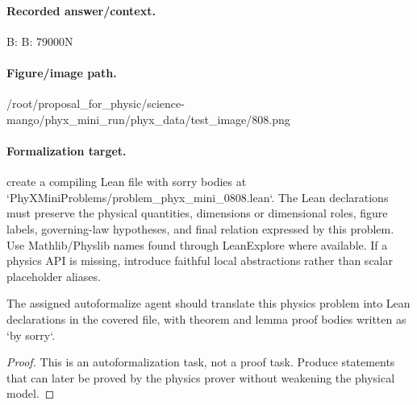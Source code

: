 \paragraph{Recorded answer/context.}
B: B: 79000N

\paragraph{Figure/image path.}
/root/proposal\_for\_physic/science-mango/phyx\_mini\_run/phyx\_data/test\_image/808.png

\paragraph{Formalization target.}
create a compiling Lean file with sorry bodies at `PhyXMiniProblems/problem\_phyx\_mini\_0808.lean`. The Lean declarations must preserve the physical quantities, dimensions or dimensional roles, figure labels, governing-law hypotheses, and final relation expressed by this problem.
Use Mathlib/Physlib names found through LeanExplore where available. If a physics API is missing, introduce faithful local abstractions rather than scalar placeholder aliases.

\begin{theorem}
\label{thm:physics:phyx_mini_0808:target}
The assigned autoformalize agent should translate this physics problem into Lean declarations in the covered file, with theorem and lemma proof bodies written as `by sorry`.
\end{theorem}
\begin{proof}
This is an autoformalization task, not a proof task. Produce statements that can later be proved by the physics prover without weakening the physical model.
\end{proof}

